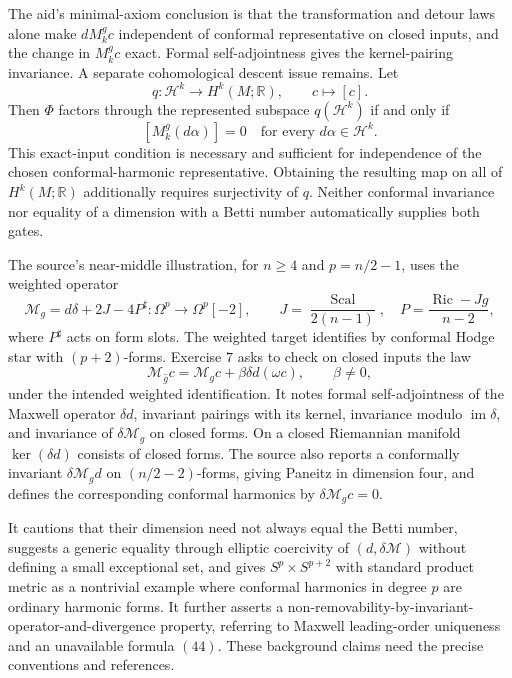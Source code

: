 \documentclass[11pt]{article}
\newcommand{\R}{\mathbb{R}}
\begin{document}
The aid's minimal-axiom conclusion is that the transformation and detour laws alone make \(dM_k^g c\) independent of conformal representative on closed inputs, and the change in \(M_k^g c\) exact. Formal self-adjointness gives the kernel-pairing invariance. A separate cohomological descent issue remains. Let
\[
 q:\mathcal H^k\to H^k(M;\R),\qquad c\mapsto[c].
\]
Then \(\Phi\) factors through the represented subspace \(q(\mathcal H^k)\) if and only if
\[
 [M_k^g(d\alpha)]=0
 \quad\text{for every }d\alpha\in\mathcal H^k.
\]
This exact-input condition is necessary and sufficient for independence of the chosen conformal-harmonic representative. Obtaining the resulting map on all of \(H^k(M;\R)\) additionally requires surjectivity of \(q\). Neither conformal invariance nor equality of a dimension with a Betti number automatically supplies both gates.

The source's near-middle illustration, for \(n\geq4\) and \(p=n/2-1\), uses the weighted operator
\[
 \mathcal M_g=d\delta+2J-4P^{\sharp}:\Omega^p\to\Omega^p[-2],
 \qquad J=\frac{\operatorname{Scal}}{2(n-1)},\quad
 P=\frac{\operatorname{Ric}-Jg}{n-2},
\]
where \(P^{\sharp}\) acts on form slots. The weighted target identifies by conformal Hodge star with \((p+2)\)-forms. Exercise \(7\) asks to check on closed inputs the law
\[
 \mathcal M_{\widehat g}c=\mathcal M_gc+\beta\delta d(\omega c),\qquad\beta\ne0,
\]
under the intended weighted identification. It notes formal self-adjointness of the Maxwell operator \(\delta d\), invariant pairings with its kernel, invariance modulo \(\operatorname{im}\delta\), and invariance of \(\delta\mathcal M_g\) on closed forms. On a closed Riemannian manifold \(\ker(\delta d)\) consists of closed forms. The source also reports a conformally invariant \(\delta\mathcal M_gd\) on \((n/2-2)\)-forms, giving Paneitz in dimension four, and defines the corresponding conformal harmonics by \(\delta\mathcal M_gc=0\).

It cautions that their dimension need not always equal the Betti number, suggests a generic equality through elliptic coercivity of \((d,\delta\mathcal M)\) without defining a small exceptional set, and gives \(S^p\times S^{p+2}\) with standard product metric as a nontrivial example where conformal harmonics in degree \(p\) are ordinary harmonic forms. It further asserts a non-removability-by-invariant-operator-and-divergence property, referring to Maxwell leading-order uniqueness and an unavailable formula \((44)\). These background claims need the precise conventions and references.
\end{document}
